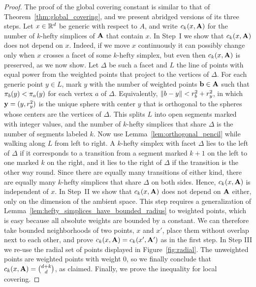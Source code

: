 \documentclass[a4paper,UKenglish,cleveref, autoref,numberwithinsect]{socg-lipics-v2021}
\newcommand {\mm}[1] {\ifmmode{#1}\else{\mbox{\(#1\)}}\fi}
\theoremstyle{plain}
\newcommand{\Rspace}        {\mm{{\mathbb R}}}
\newcommand{\AAA}           {\mm{\bf A}}
\newcommand{\bbb}           {\mm{\bf b}}
\newcommand{\yyy}           {\mm{\bf{y}}}
\newcommand{\wdist}[2]      {\mm{\pi_{#1}{({#2})}}}
\newcommand{\cover}[2]      {\mm{{c}_{#1}{({#2})}}}
\newcommand{\Edist}[2]      {\mm{\|{#1}-{#2}\|}}
\begin{document}
\begin{proof}
  The proof of the global covering constant is similar to that of Theorem~\ref{thm:global_covering}, and we present abridged versions of its three steps.
  Let $x \in \Rspace^d$ be generic with respect to $A$, and write $\cover{k}{x,\AAA}$ for the number of $k$-hefty simplices of $\AAA$ that contain $x$.
  \smallskip
  In Step~I we show that $\cover{k}{x,\AAA}$ does not depend on $x$.
  Indeed, if we move $x$ continuously it can possibly change only when $x$ crosses a facet of some $k$-hefty simplex, but even then $\cover{k}{x,\AAA}$ is preserved, as we now show.
  Let $\Delta$ be such a facet and $L$ the line of points with equal power from the weighted points that project to the vertices of $\Delta$.
  For each generic point $y \in L$, mark $y$ with the number of weighted points $\bbb \in \AAA$ such that $\wdist{b}{y} < \wdist{a}{y}$ for each vertex $a$ of $\Delta$.
  Equivalently, $\Edist{b}{y} < r_b^2 + r_y^2$, in which $\yyy = (y, r_y^2)$ is the unique sphere with center $y$ that is orthogonal to the spheres whose centers are the vertices of $\Delta$.
  This splits $L$ into open segments marked with integer values, and the number of $k$-hefty simplices that share $\Delta$ is the number of segments labeled $k$.
  Now use Lemma~\ref{lem:orthogonal_pencil} while walking along $L$ from left to right.
  A $k$-hefty simplex with facet $\Delta$ lies to the left of $\Delta$ if it corresponds to a transition from a segment marked $k+1$ on the left to one marked $k$ on the right, and it lies to the right of $\Delta$ if the transition is the other way round.
  Since there are equally many transitions of either kind, there are equally many $k$-hefty simplices that share $\Delta$ on both sides.
  Hence, $\cover{k}{x,\AAA}$ is independent of $x$.
  \smallskip
  In Step~II we show that $\cover{k}{x,\AAA}$ does not depend on $\AAA$ either, only on the dimension of the ambient space.
  This step requires a generalization of Lemma~\ref{lem:hefty_simplices_have_bounded_radius} to weighted points, which is easy because all absolute weights are bounded by a constant.
  We can therefore take bounded neighborhoods of two points, $x$ and $x'$, place them without overlap next to each other, and prove $\cover{k}{x,\AAA} = \cover{k}{x',\AAA'}$ as in the first step.
  In Step III we re-use the radial set of points displayed in Figure~\ref{fig:radial}.
  The unweighted points are weighted points with weight $0$, so we finally conclude that $\cover{k}{x,\AAA} = \binom{d+k}{d}$, as claimed.
  \smallskip
  Finally, we prove the inequality for local covering.

\end{proof}
\end{document}
